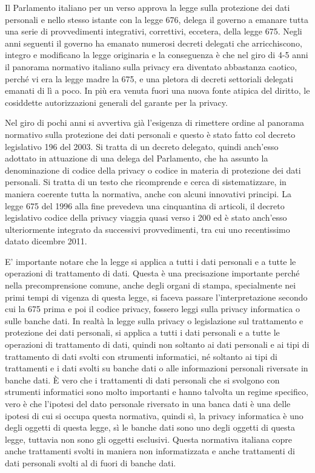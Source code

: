 Il Parlamento italiano per un verso approva la legge sulla protezione dei dati personali e nello stesso istante con la legge 676, delega il governo a emanare tutta una serie di provvedimenti integrativi, correttivi, eccetera, della legge 675. Negli anni seguenti il governo ha emanato numerosi decreti delegati che arricchiscono, integro e modificano la legge originaria e la conseguenza è che nel giro di 4-5 anni il panorama normativo italiano sulla privacy era diventato abbastanza caotico, perché vi era la legge madre la 675, e  una pletora di decreti settoriali delegati emanati di lì a poco. In più era venuta fuori una nuova fonte atipica del diritto, le cosiddette autorizzazioni generali del garante per la privacy. 

Nel giro di pochi anni si avvertiva già l'esigenza di rimettere ordine al panorama normativo sulla protezione dei dati personali e questo è stato fatto col decreto legislativo 196 del 2003. Si tratta di un decreto delegato, quindi anch'esso adottato in attuazione di una delega del Parlamento, che ha assunto la denominazione di codice della privacy o codice in materia di protezione dei dati personali. Si tratta di un testo che ricomprende e cerca di sistematizzare, in maniera coerente tutta la normativa, anche con alcuni innovativi principi. La legge 675 del 1996 alla fine prevedeva una cinquantina di articoli, il decreto legislativo codice della privacy viaggia quasi verso i 200 ed è stato anch'esso ulteriormente integrato da successivi provvedimenti, tra cui uno recentissimo datato dicembre 2011. 

E' importante notare che la legge si applica a tutti i dati personali e a tutte le operazioni di trattamento di dati. Questa è una precisazione importante perché nella precomprensione comune, anche degli organi di stampa, specialmente nei primi tempi di vigenza di questa legge, si faceva passare l'interpretazione secondo cui la 675 prima e poi il codice privacy, fossero leggi sulla privacy informatica o sulle banche dati. In realtà la legge sulla privacy o legislazione sul trattamento e protezione dei dati personali, si applica a tutti i dati personali e a tutte le operazioni di trattamento di dati, quindi non soltanto ai dati personali e ai tipi di trattamento di dati svolti con strumenti informatici, né soltanto ai tipi di trattamenti e i dati svolti su banche dati o alle informazioni personali riversate in banche dati. È vero che i trattamenti di dati personali che si svolgono con strumenti informatici sono molto importanti e hanno talvolta un regime specifico, vero è che l'ipotesi del dato personale riversato in una banca dati è una delle ipotesi di cui si occupa questa normativa, quindi sì, la privacy informatica è uno degli oggetti di questa legge, sì le banche dati sono uno degli oggetti di questa legge, tuttavia non sono gli oggetti esclusivi. Questa normativa italiana copre anche trattamenti svolti in maniera non informatizzata e anche trattamenti di dati personali svolti al di fuori di banche dati. 

